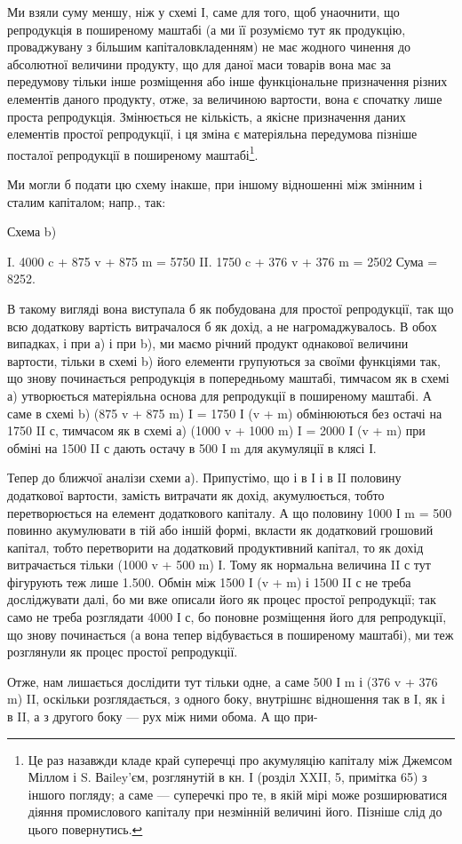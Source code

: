 Ми взяли суму меншу, ніж у схемі І, саме для того, щоб унаочнити,
що репродукція в поширеному маштабі (а ми її розуміємо тут як продукцію,
проваджувану з більшим капіталовкладенням) не має жодного
чинення до абсолютної величини продукту, що для даної маси товарів
вона має за передумову тільки інше розміщення або інше функціональне
призначення різних елементів даного продукту, отже, за величиною вартости,
вона є спочатку лише проста репродукція. Змінюється не кількість,
а якісне призначення даних елементів простої репродукції, і ця зміна є
матеріяльна передумова пізніше посталої репродукції в поширеному
маштабі\footnote{
Це раз назавжди кладе край суперечці про акумуляцію капіталу між Джемсом
Міллом і S. Ваiley’єм, розглянутій в кн. І (розділ XXII, 5, примітка 65) з іншого
погляду; а саме — суперечкі про те, в якій мірі може розширюватися діяння промислового
капіталу при незмінній величині його. Пізніше слід до цього повернутись.
}.

Ми могли б подати цю схему інакше, при іншому відношенні між
змінним і сталим капіталом; напр., так:

Схема b)

I. 4000 c + 875 v + 875 m = 5750
II. 1750 c + 376 v + 376 m = 2502 Сума = 8252.

В такому вигляді вона виступала б як побудована для простої репродукції,
так що всю додаткову вартість витрачалося б як дохід, а не нагромаджувалось.
В обох випадках, і при а) і при b), ми маємо річний
продукт однакової величини вартости, тільки в схемі b) його елементи
групуються за своїми функціями так, що знову починається репродукція
в попередньому маштабі, тимчасом як в схемі а) утворюється матеріяльна
основа для репродукції в поширеному маштабі. А саме в схемі b)
(875 v + 875 m) I = 1750 І (v + m) обмінюються без остачі на
1750 II с, тимчасом як в схемі а) (1000 v + 1000 m) I = 2000 І
(v + m) при обміні на 1500 II с дають остачу в 500 І m для акумуляції
в клясі І.

Тепер до ближчої аналізи схеми а). Припустімо, що і в І і в II половину
додаткової вартости, замість витрачати як дохід, акумулюється, тобто
перетворюється на елемент додаткового капіталу. А що половину 1000
І m = 500 повинно акумулювати в тій або іншій формі, вкласти як додатковий
грошовий капітал, тобто перетворити на додатковий продуктивний
капітал, то як дохід витрачається тільки (1000 v + 500 m) І. Тому
як нормальна величина II с тут фігурують теж лише 1.500. Обмін між
1500 І (v + m) і 1500 II с не треба досліджувати далі, бо ми вже описали
його як процес простої репродукції; так само не треба розглядати
4000 І с, бо поновне розміщення його для репродукції, що знову починається
(а вона тепер відбувається в поширеному маштабі), ми теж розглянули
як процес простої репродукції.

Отже, нам лишається дослідити тут тільки одне, а саме 500 І m і
(376 v + 376 m) II, оскільки розглядається, з одного боку, внутрішнє відношення
так в І, як і в II, а з другого боку — рух між ними обома. А що при-